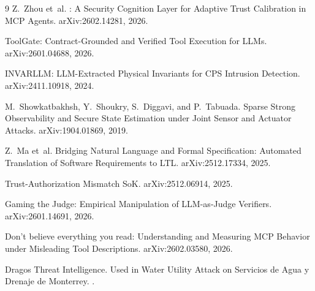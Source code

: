 \documentclass[11pt]{article}
\begin{document}

\begin{thebibliography}{9}
Z.~Zhou et~al.
: A Security Cognition Layer for Adaptive Trust Calibration in {MCP} Agents.
\newblock arXiv:2602.14281, 2026.

{ToolGate}: Contract-Grounded and Verified Tool Execution for {LLMs}.
\newblock arXiv:2601.04688, 2026.

{INVARLLM}: {LLM}-Extracted Physical Invariants for {CPS} Intrusion Detection.
\newblock arXiv:2411.10918, 2024.

M.~Showkatbakhsh, Y.~Shoukry, S.~Diggavi, and P.~Tabuada.
\newblock Sparse Strong Observability and Secure State Estimation under Joint Sensor and Actuator Attacks.
\newblock arXiv:1904.01869, 2019.

Z.~Ma et~al.
\newblock Bridging Natural Language and Formal Specification: Automated Translation of Software Requirements to {LTL}.
\newblock arXiv:2512.17334, 2025.

{Trust-Authorization Mismatch SoK}.
\newblock arXiv:2512.06914, 2025.

{Gaming the Judge}: Empirical Manipulation of {LLM-as-Judge} Verifiers.
\newblock arXiv:2601.14691, 2026.

{Don't believe everything you read}: Understanding and Measuring {MCP}
Behavior under Misleading Tool Descriptions.
\newblock arXiv:2602.03580, 2026.

{Dragos Threat Intelligence}.
 Used in Water Utility Attack on {Servicios de Agua y Drenaje
de Monterrey}.
.

\end{thebibliography}
\end{document}
